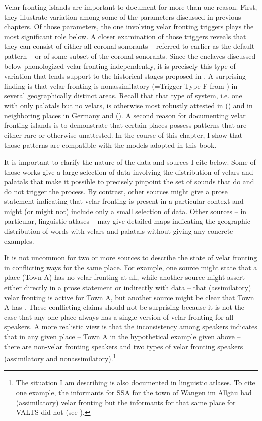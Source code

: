 Velar fronting islands are important to document for more than one reason. First, they illustrate variation among some of the parameters discussed in previous chapters. Of those parameters, the one involving velar fronting triggers plays the most significant role below. A closer examination of those triggers reveals that they can consist of either all coronal sonorants -- referred to earlier as the default pattern -- or of some subset of the coronal sonorants. Since the enclaves discussed below phonologized velar fronting independently, it is precisely this type of variation that lends support to the historical stages proposed in . A surprising finding is that velar fronting is nonassimilatory (=Trigger Type F from ) in several geographically distinct areas. Recall that that type of system, i.e. one with only palatals but no velars, is otherwise most robustly attested in  () and in neighboring places in Germany and  (). A second reason for documenting velar fronting islands is to demonstrate that certain places possess patterns that are either rare or otherwise unattested. In the course of this chapter, I show that those patterns are compatible with the models adopted in this book.

It is important to clarify the nature of the data and sources I cite below. Some of those works give a large selection of data involving the distribution of velars and palatals that make it possible to precisely pinpoint the set of sounds that do and do not trigger the process. By contrast, other sources might give a prose statement indicating that velar fronting is present in a particular context and might (or might not) include only a small selection of data. Other sources -- in particular, linguistic atlases -- may give detailed maps indicating the geographic distribution of words with velars and palatals without giving any concrete examples.

It is not uncommon for two or more sources to describe the state of velar fronting in conflicting ways for the same place. For example, one source might state that a place (Town A) has no velar fronting at all, while another source might assert -- either directly in a prose statement or indirectly with data -- that (assimilatory) velar fronting is active for Town A, but another source might be clear that Town A has . These conflicting claims should not be surprising because it is not the case that any one place always has a single version of velar fronting for all speakers. A more realistic view is that the inconsistency among speakers indicates that in any given place -- Town A in the hypothetical example given above -- there are non-velar fronting speakers and two types of velar fronting speakers (assimilatory and nonassimilatory).\footnote{{The situation I am describing is also documented in linguistic atlases. To cite one example, the informants for SSA for the town of Wangen im Allgäu had (assimilatory) velar fronting but the informants for that same place for VALTS did not (see ).}}

